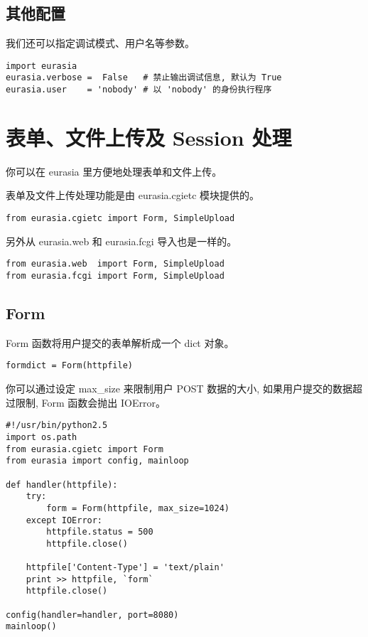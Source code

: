 \documentclass{manual}
\begin{document}
\subsection{其他配置}

我们还可以指定调试模式、用户名等参数。

\begin{verbatim}
import eurasia
eurasia.verbose =  False   # 禁止输出调试信息, 默认为 True
eurasia.user    = 'nobody' # 以 'nobody' 的身份执行程序
\end{verbatim}

\section{表单、文件上传及 Session 处理}

你可以在 eurasia 里方便地处理表单和文件上传。

表单及文件上传处理功能是由 eurasia.cgietc 模块提供的。

\begin{verbatim}
from eurasia.cgietc import Form, SimpleUpload
\end{verbatim}

另外从 eurasia.web 和 eurasia.fcgi 导入也是一样的。

\begin{verbatim}
from eurasia.web  import Form, SimpleUpload
from eurasia.fcgi import Form, SimpleUpload
\end{verbatim}


\subsection{Form}

Form 函数将用户提交的表单解析成一个 dict 对象。

\begin{verbatim}
formdict = Form(httpfile)
\end{verbatim}

你可以通过设定 max_size 来限制用户 POST 数据的大小, 如果用户提交的数据超过限制, Form 函数会抛出 IOError。

\begin{verbatim}
#!/usr/bin/python2.5
import os.path
from eurasia.cgietc import Form
from eurasia import config, mainloop

def handler(httpfile):
	try:
		form = Form(httpfile, max_size=1024)
	except IOError:
		httpfile.status = 500
		httpfile.close()

	httpfile['Content-Type'] = 'text/plain'
	print >> httpfile, `form`
	httpfile.close()

config(handler=handler, port=8080)
mainloop()
\end{verbatim}
\end{document}
